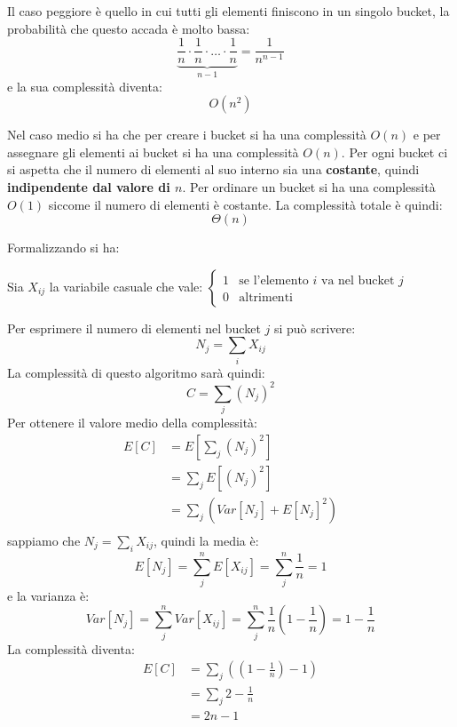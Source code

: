\documentclass[a4paper]{article}
\begin{document}
\vspace{1em}
\noindent
Il caso peggiore è quello in cui tutti gli elementi finiscono in un singolo bucket,
la probabilità che questo accada è molto bassa:
\[
  \underbrace{\frac{1}{n} \cdot \frac{1}{n} \cdot \dots \cdot \frac{1}{n}}_{n-1}
  = \frac{1}{n^{n-1}}
\] 
e la sua complessità diventa:
\[
  O(n^2)
\] 

\vspace{1em}
\noindent
Nel caso medio si ha che per creare i bucket si ha una complessità \( O(n) \) e per
assegnare gli elementi ai bucket si ha una complessità \( O(n) \). Per ogni bucket
ci si aspetta che il numero di elementi al suo interno sia una \textbf{costante},
quindi \textbf{indipendente dal valore di \( n \)}. Per ordinare un bucket si ha una
complessità \( O(1) \) siccome il numero di elementi è costante. La complessità totale
è quindi:
\[
  \Theta(n)
\]

\vspace{1em}
\noindent
Formalizzando si ha:

\noindent
Sia \( X_{ij} \) la variabile casuale che vale: 
$\begin{cases}
  1 & \text{se l'elemento } i \text{ va nel bucket } j\\
  0 & \text{altrimenti}
\end{cases}$

\noindent
Per esprimere il numero di elementi nel bucket \( j \) si può scrivere:
\[
  N_j = \sum_{i} X_{ij}
\] 
La complessità di questo algoritmo sarà quindi:
\[
  C = \sum_{j} (N_j)^2
\] 
Per ottenere il valore medio della complessità:
\[
  \begin{aligned}
    E[C] &= E\left[\sum_{j} (N_j)^2\right] \\
         &= \sum_{j} E[(N_j)^2] \\
         &= \sum_{j} \left( Var[N_j] + E[N_j]^2 \right) \\
  \end{aligned}
\] 
sappiamo che \( N_j = \sum_{i} X_{ij} \), quindi la media è:
\[
  E[N_j] = \sum_{j}^{n} E[X_{ij}] = \sum_{j}^{n} \frac{1}{n} = 1
\] 
e la varianza è:
\[
  Var[N_j] = \sum_{j}^{n} Var[X_{ij}] = \sum_{j}^{n} \frac{1}{n} \left( 1 - \frac{1}{n} \right) = 1 - \frac{1}{n}
\] 
La complessità diventa:
\[
  \begin{aligned}
    E[C] &= \sum_{j} \left( \left( 1 - \frac{1}{n} \right) - 1 \right) \\
         &= \sum_{j} 2 - \frac{1}{n} \\
         &= 2n - 1
  \end{aligned}
\] 
\end{document}

